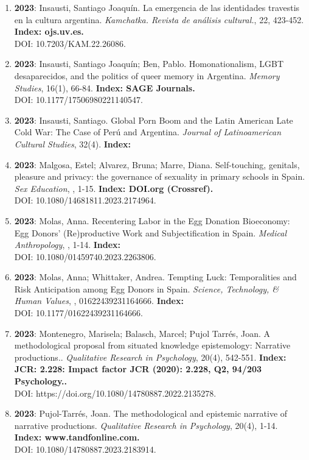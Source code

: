 \begin{enumerate}
\item {\bf 2023}: Insausti, Santiago Joaquín.  La emergencia de las identidades travestis en la cultura argentina. {\it Kamchatka. Revista de análisis cultural.}, 22, 423-452. {\bf Index: ojs.uv.es. } \\ DOI: 10.7203/KAM.22.26086. \filbreak
\item {\bf 2023}: Insausti, Santiago Joaquín; Ben, Pablo.  Homonationalism, LGBT desaparecidos, and the politics of queer memory in Argentina. {\it Memory Studies}, 16(1), 66-84. {\bf Index: SAGE Journals. } \\ DOI: 10.1177/17506980221140547. \filbreak
\item {\bf 2023}: Insausti, Santiago.  Global Porn Boom and the Latin American Late Cold War: The Case of Perú and Argentina. {\it Journal of Latinoamerican Cultural Studies}, 32(4). {\bf Index: } \filbreak
\item {\bf 2023}: Malgosa, Estel; Alvarez, Bruna; Marre, Diana.  Self-touching, genitals, pleasure and privacy: the governance of sexuality in primary schools in Spain. {\it Sex Education}, , 1-15. {\bf Index: DOI.org (Crossref). } \\ DOI: 10.1080/14681811.2023.2174964. \filbreak
\item {\bf 2023}: Molas, Anna.  Recentering Labor in the Egg Donation Bioeconomy: Egg Donors’ (Re)productive Work and Subjectification in Spain. {\it Medical Anthropology}, , 1-14. {\bf Index: } \\ DOI: 10.1080/01459740.2023.2263806. \filbreak
\item {\bf 2023}: Molas, Anna; Whittaker, Andrea.  Tempting Luck: Temporalities and Risk Anticipation among Egg Donors in Spain. {\it Science, Technology, \& Human Values}, , 01622439231164666. {\bf Index: } \\ DOI: 10.1177/01622439231164666. \filbreak
\item {\bf 2023}: Montenegro, Marisela; Balasch, Marcel; Pujol Tarrés, Joan.  A methodological proposal from situated knowledge epistemology: Narrative productions.. {\it Qualitative Research in Psychology}, 20(4), 542-551. {\bf Index: JCR: 2.228: Impact factor JCR (2020): 2.228, Q2, 94/203 Psychology..  } \\ DOI: https://doi.org/10.1080/14780887.2022.2135278. \filbreak
\item {\bf 2023}: Pujol-Tarrés, Joan.  The methodological and epistemic narrative of narrative productions. {\it Qualitative Research in Psychology}, 20(4), 1-14. {\bf Index: www.tandfonline.com. } \\ DOI: 10.1080/14780887.2023.2183914. \filbreak

\end{enumerate}
